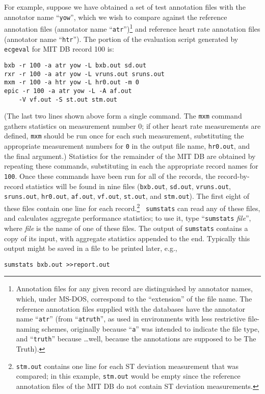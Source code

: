 For example, suppose we have obtained a set of test annotation files with the
annotator name ``{\tt yow}'', which we wish to compare against the reference
annotation files (annotator name ``{\tt atr}'')\footnote{
Annotation files for any given record are distinguished by annotator names,
which, under MS-DOS, correspond to the ``extension'' of the file name.  The
reference annotation files supplied with the databases have the annotator
name ``{\tt atr}'' (from ``{\tt atruth}'', as used in environments with less
restrictive file-naming schemes, originally because ``{\tt a}'' was intended to
indicate the file type, and ``{\tt truth}'' because \ldots well, because the
annotations are supposed to be The Truth).}
and reference heart rate annotation files (annotator name ``{\tt htr}'').
The portion of the evaluation script generated by {\tt ecgeval} for MIT DB
record 100 is:
\begin{verbatim}
bxb -r 100 -a atr yow -L bxb.out sd.out
rxr -r 100 -a atr yow -L vruns.out sruns.out
mxm -r 100 -a htr yow -L hr0.out -m 0
epic -r 100 -a atr yow -L -A af.out
    -V vf.out -S st.out stm.out
\end{verbatim}
(The last two lines shown above form a single command.  The {\tt mxm} command
gathers statistics on measurement number 0; if other heart rate measurements
are defined, {\tt mxm} should be run once for each such measurement,
substituting the appropriate measurement numbers for {\tt 0} in the output
file name, {\tt hr0.out}, and the final argument.)  Statistics for the
remainder of the MIT DB are obtained by repeating these commands, substituting
in each the appropriate record names for {\tt 100}.  Once these commands have
been run for all of the records, the record-by-record statistics will be found
in nine files ({\tt bxb.out}, {\tt sd.out}, {\tt vruns.out}, {\tt sruns.out},
{\tt hr0.out}, {\tt af.out}, {\tt vf.out}, {\tt st.out}, and {\tt stm.out}).
The first eight of these files contain one line for each record.\footnote{
{\tt stm.out} contains one line for each ST deviation measurement that was
compared; in this example, {\tt stm.out} would be empty since the reference
annotation files of the MIT DB do not contain ST deviation measurements.} {\tt
sumstats} can read any of these files, and calculates aggregate performance
statistics; to use it, type ``{\tt sumstats} {\it file}'', where {\it file} is
the name of one of these files.  The output of {\tt sumstats} contains a copy
of its input, with aggregate statistics appended to the end.  Typically this
output might be saved in a file to be printed later, e.g.,
\begin{verbatim}
sumstats bxb.out >>report.out
\end{verbatim}

